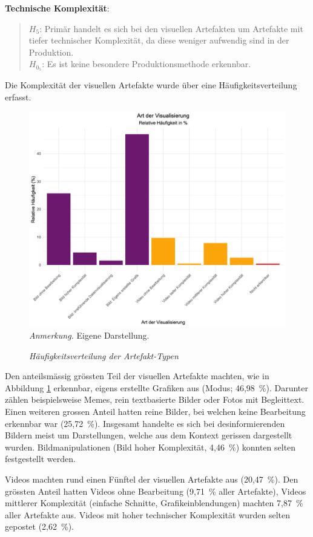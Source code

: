 \documentclass[12pt,a4paper]{article}        %
\begin{document}
\textbf{Technische Komplexität}:
\begin{quote}
  \(H_5\): Primär handelt es sich bei den visuellen Artefakten um Artefakte mit tiefer technischer Komplexität, da diese weniger aufwendig sind in der Produktion.\\
  \(H_{0_5}\): Es ist keine besondere Produktionsmethode erkennbar.
\end{quote}
Die Komplexität der visuellen Artefakte wurde über eine Häufigkeitsverteilung erfasst. 
\begin{figure}[H]
    \caption{\textit{Häufigkeitsverteilung der Artefakt-Typen}}
    \label{fig:results_artefact_type}
    \centering
    \includegraphics[width=0.75\linewidth]{artefact_type_plot.png}\\
\footnotesize\textit{Anmerkung.} Eigene Darstellung.
\end{figure}
Den anteilsmässig grössten Teil der visuellen Artefakte machten, wie in Abbildung \ref{fig:results_artefact_type} erkennbar, eigens erstellte Grafiken aus (Modus; 46,98 \%). Darunter zählen beispielsweise Memes, rein textbasierte Bilder oder Fotos mit Begleittext. \\ 
Einen weiteren grossen Anteil hatten reine Bilder, bei welchen keine Bearbeitung erkennbar war (25,72 \%). Insgesamt handelte es sich bei desinformierenden Bildern meist um Darstellungen, welche aus dem Kontext gerissen dargestellt wurden. Bildmanipulationen (Bild hoher Komplexität, 4,46 \%) konnten selten festgestellt werden.

Videos machten rund einen Fünftel der visuellen Artefakte aus (20,47 \%). Den grössten Anteil hatten Videos ohne Bearbeitung (9,71 \% aller Artefakte), Videos mittlerer Komplexität (einfache Schnitte, Grafikeinblendungen) machten 7,87 \% aller Artefakte aus. Videos mit hoher technischer Komplexität wurden selten gepostet (2,62 \%).
\end{document}
